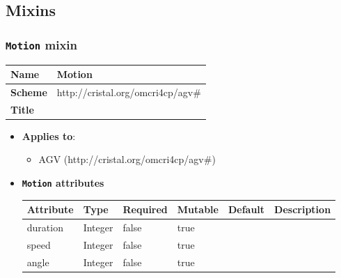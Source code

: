 \subsection{Mixins}
\subsubsection{\texttt{Motion} mixin}
\begin{center}
\begin{tabular}{|l|l|}
  \hline
  \textbf{Name} & Motion \\
  \hline  
  \textbf{Scheme} & http://cristal.org/omcri4cp/agv\# \\
  \hline
  \textbf{Title} &  \\
  \hline
\end{tabular}
\end{center}
\begin{itemize}
\item \textbf{Applies to}:
\begin{itemize}
	\item AGV (http://cristal.org/omcri4cp/agv\#)
\end{itemize}
\end{itemize} 

\begin{itemize}
\item \textbf{\texttt{Motion} attributes}

\begin{tabularx}{\textwidth}{|l|l|p{1.4cm}|p{1.3cm}|l|X|}
  \hline
  \textbf{Attribute} & \textbf{Type} & \textbf{Required} & \textbf{Mutable} & \textbf{Default} & \textbf{Description} \\
  \hline  
  duration & Integer & false & true &  &  \\
  \hline
  speed & Integer & false & true &  &  \\
  \hline
  angle & Integer & false & true &  &  \\
  \hline
\end{tabularx}
\end{itemize}

